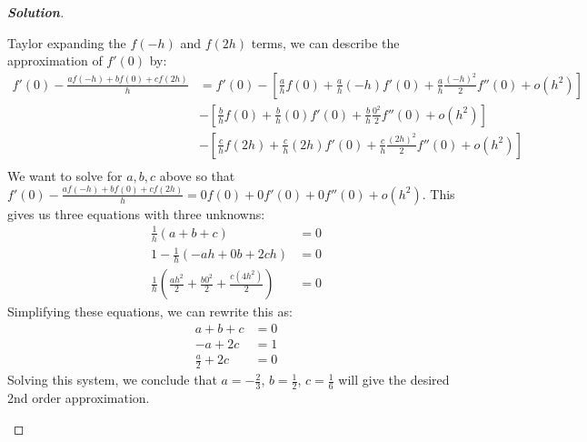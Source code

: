 \documentclass[11pt]{article}
\newenvironment{solution}{%
  \begin{proof}[\textbf{Solution}]$ $\par\nobreak\ignorespaces
}{%
  \end{proof}
}
\theoremstyle{definition}
\begin{document}
\begin{solution}
\begin{enumerate}[(a)]
Taylor expanding the $f(-h)$ and $f(2h)$ terms, we can describe the approximation of $f'(0)$ by:
\begin{align*}
    f'(0) - \frac{a f(-h) + b f(0) + c f(2h)}{h} &= f'(0) - \left[\frac{a}{h}f(0) + \frac{a}{h}(-h)f'(0) + \frac{a}{h}\frac{(-h)^2}{2} f''(0) + o(h^2)\right]
     \\
    &- \left[\frac{b}{h}f(0) + \frac{b}{h}(0)f'(0) + \frac{b}{h}\frac{0^2}{2}f''(0) + o(h^2)\right] \\
    &- \left[\frac{c}{h}f(2h) + \frac{c}{h}(2h)f'(0) + \frac{c}{h}\frac{(2h)^2}{2}f''(0) + o(h^2)\right] \\
\end{align*}
We want to solve for $a, b, c$ above so that $f'(0) - \frac{a f(-h) + b f(0) + c f(2h)}{h} = 0f(0) + 0 f'(0) + 0 f''(0) + o(h^2)$. This gives us three equations with three unknowns:
\begin{align*}
    \frac{1}{h}(a + b + c) &= 0 \\
    1 - \frac{1}{h}(-ah + 0b + 2ch) &= 0 \\
    \frac{1}{h}(\frac{ah^2}{2} + \frac{b0^2}{2} + \frac{c(4h^2)}{2}) &= 0
\end{align*}
Simplifying these equations, we can rewrite this as:
\begin{align*}
    a + b + c &= 0 \\
    -a + 2c &= 1 \\
    \frac{a}{2} + 2c &= 0
\end{align*}
Solving this system, we conclude that $a = -\frac{2}{3}$, $b = \frac{1}{2}$, $c = \frac{1}{6}$ will give the desired 2nd order approximation.
\end{enumerate}
\end{solution}
\end{document}
